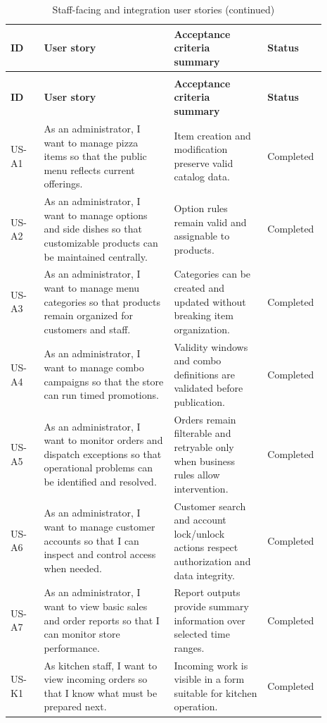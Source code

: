 \begingroup
\footnotesize
\setlength{\LTpre}{0.4em}
\setlength{\LTpost}{0.8em}
\begin{longtable}{L{0.10\linewidth} L{0.39\linewidth} L{0.28\linewidth} L{0.12\linewidth}}
\caption{Staff-facing and integration user stories}\label{tab:staff-user-stories}\\
\toprule
\textbf{ID} & \textbf{User story} & \textbf{Acceptance criteria summary} & \textbf{Status} \\
\midrule
\endfirsthead
\caption[]{Staff-facing and integration user stories (continued)}\\
\toprule
\textbf{ID} & \textbf{User story} & \textbf{Acceptance criteria summary} & \textbf{Status} \\
\midrule
\endhead
\bottomrule
\endfoot
\bottomrule
\endlastfoot
US-A1 & As an administrator, I want to manage pizza items so that the public menu reflects current offerings. & Item creation and modification preserve valid catalog data. & Completed \\
US-A2 & As an administrator, I want to manage options and side dishes so that customizable products can be maintained centrally. & Option rules remain valid and assignable to products. & Completed \\
US-A3 & As an administrator, I want to manage menu categories so that products remain organized for customers and staff. & Categories can be created and updated without breaking item organization. & Completed \\
US-A4 & As an administrator, I want to manage combo campaigns so that the store can run timed promotions. & Validity windows and combo definitions are validated before publication. & Completed \\
US-A5 & As an administrator, I want to monitor orders and dispatch exceptions so that operational problems can be identified and resolved. & Orders remain filterable and retryable only when business rules allow intervention. & Completed \\
US-A6 & As an administrator, I want to manage customer accounts so that I can inspect and control access when needed. & Customer search and account lock/unlock actions respect authorization and data integrity. & Completed \\
US-A7 & As an administrator, I want to view basic sales and order reports so that I can monitor store performance. & Report outputs provide summary information over selected time ranges. & Completed \\
US-K1 & As kitchen staff, I want to view incoming orders so that I know what must be prepared next. & Incoming work is visible in a form suitable for kitchen operation. & Completed \\

\end{longtable}
